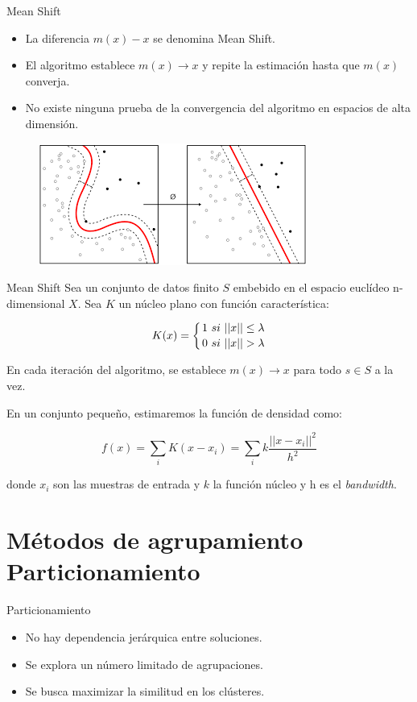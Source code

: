 \documentclass[spanish]{beamer}
\begin{document}
\begin{frame}{Mean Shift}
\begin{itemize}
\item La diferencia $m(x)-x$ se denomina Mean Shift.\break

\item El algoritmo establece $m(x)\rightarrow x$ y repite la estimación hasta que $m(x)$ converja.\break

\item No existe ninguna prueba de la convergencia del algoritmo en espacios de alta dimensión.
\end{itemize}

\begin{figure}[h]
\centering
\includegraphics[scale=0.45]{dani/MS.png}
\end{figure}
\end{frame}

\begin{frame}{Mean Shift}
Sea un conjunto de datos finito $S$ embebido en el espacio euclídeo n-dimensional $X$. Sea $K$ un núcleo plano con función característica:

$$K(x)=\left\{
1 \ si \ ||x||\leq \lambda \atop
0 \ si \ ||x||> \lambda
\right.$$

En cada iteración del algoritmo, se establece $m(x)\rightarrow x$ para todo $s\in S$ a la vez.\break 

En un conjunto pequeño, estimaremos la función de densidad como:

$$f(x)=\sum_i K(x-x_i)=\sum_i k\dfrac{||x-x_i||^2}{h^2}$$

donde $x_i$ son las muestras de entrada y $k$ la función núcleo y h es el \textit{bandwidth}. 
\end{frame}

\section{Métodos de agrupamiento\\ Particionamiento}


\begin{frame}{Particionamiento}
  \begin{itemize}
  \item No hay dependencia jerárquica entre soluciones.
  \item Se explora un número limitado de agrupaciones.
  \item Se busca maximizar la similitud en los clústeres.
  \end{itemize}

\end{frame}
\end{document}
